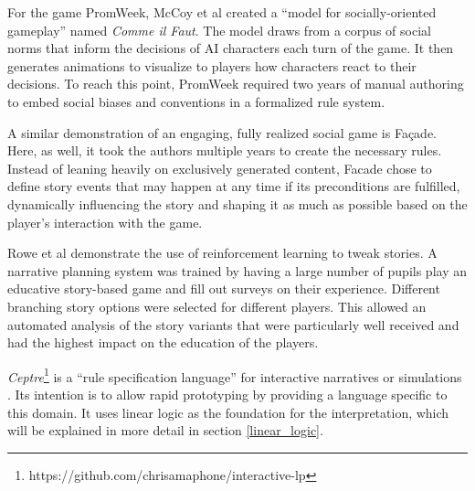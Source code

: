 For the game PromWeek, McCoy et al created a \enquote{model for socially-oriented gameplay} named \emph{Comme il Faut}.
The model draws from a corpus of social norms that inform the decisions of AI characters each turn of the game.
It then generates animations to visualize to players how characters react to their decisions.
To reach this point, PromWeek required two years of manual authoring to embed social biases and conventions in a formalized rule system. 

A similar demonstration of an engaging, fully realized social game is Façade.
Here, as well, it took the authors multiple years to create the necessary rules.
Instead of leaning heavily on exclusively generated content, Facade chose to define story events that may happen at any time if its preconditions are fulfilled, dynamically influencing the story and shaping it as much as possible based on the player's interaction with the game.

Rowe et al demonstrate the use of reinforcement learning to tweak stories.
A narrative planning system was trained by having a large number of pupils play an educative story-based game and fill out surveys on their experience.
Different branching story options were selected for different players.
This allowed an automated analysis of the story variants that were particularly well received and had the highest impact on the education of the players.

\emph{Ceptre}\footnote{https://github.com/chrisamaphone/interactive-lp} is a \enquote{rule specification language} for interactive narratives or simulations \cite{martens_2015}.
Its intention is to allow rapid prototyping by providing a language specific to this domain.
It uses linear logic as the foundation for the interpretation, which will be explained in more detail in section \ref{linear_logic}.

